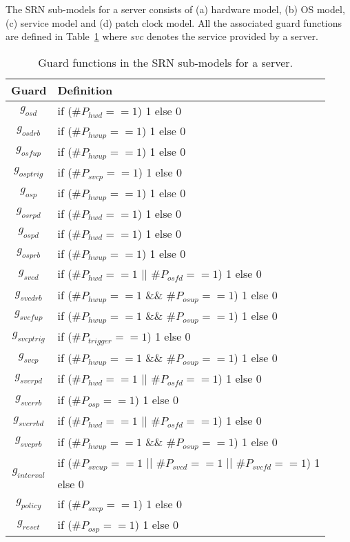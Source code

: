 \documentclass[conference]{IEEEtran}
\begin{document}
The SRN sub-models for a server consists of (a) hardware model, (b) OS model, (c) service model and (d) patch clock model. All the associated guard functions are defined in Table~\ref{tb_guard} where $\mathit{svc}$ denotes the service provided by a server.
\begin{table}[htb] \small
\caption{Guard functions in the SRN sub-models for a server.}
\label{tb_guard}
\centering
\begin{tabular}{|c|l|}
\hline
Guard & Definition\\
\hline
$g_{\mathit{osd}}$ & if (\#$P_{\mathit{hwd}}==1$) 1 else 0\\
\hline
$g_{\mathit{osdrb}}$ & if (\#$P_{\mathit{hwup}}==1$) 1 else 0\\
\hline
$g_{\mathit{osfup}}$ & if (\#$P_{\mathit{hwup}}==1$) 1 else 0\\
\hline
$g_{\mathit{osptrig}}$ & if (\#$P_{\mathit{svcp}}==1$) 1 else 0\\
\hline
$g_{\mathit{osp}}$ & if (\#$P_{\mathit{hwup}}==1$) 1 else 0\\
\hline
$g_{\mathit{osrpd}}$ & if (\#$P_{\mathit{hwd}}==1$) 1 else 0\\
\hline
$g_{\mathit{ospd}}$ & if (\#$P_{\mathit{hwd}}==1$) 1 else 0\\
\hline
$g_{\mathit{osprb}}$ & if (\#$P_{\mathit{hwup}}==1$) 1 else 0\\
\hline
$g_{\mathit{svcd}}$ & if (\#$P_{\mathit{hwd}}==1$ $||$ \#$P_{\mathit{osfd}}==1$) 1 else 0\\
\hline
$g_{\mathit{svcdrb}}$ & if (\#$P_{\mathit{hwup}}==1$ \&\& \#$P_{\mathit{osup}}==1$) 1 else 0\\
\hline
$g_{\mathit{svcfup}}$ & if (\#$P_{\mathit{hwup}}==1$ \&\& \#$P_{\mathit{osup}}==1$) 1 else 0\\
\hline
$g_{\mathit{svcptrig}}$ & if (\#$P_{\mathit{trigger}}==1$) 1 else 0\\
\hline
$g_{\mathit{svcp}}$ & if (\#$P_{\mathit{hwup}}==1$ \&\& \#$P_{\mathit{osup}}==1$) 1 else 0\\
\hline
$g_{\mathit{svcrpd}}$ & if (\#$P_{\mathit{hwd}}==1$ $||$ \#$P_{\mathit{osfd}}==1$) 1 else 0\\
\hline
$g_{\mathit{svcrrb}}$ & if (\#$P_{\mathit{osp}}==1$) 1 else 0\\
\hline
$g_{\mathit{svcrrbd}}$ & if (\#$P_{\mathit{hwd}}==1$ $||$ \#$P_{\mathit{osfd}}==1$) 1 else 0\\
\hline
$g_{\mathit{svcprb}}$ & if (\#$P_{\mathit{hwup}}==1$ \&\& \#$P_{\mathit{osup}}==1$) 1 else 0\\
\hline
\multirow{2}{*}{$g_{\mathit{interval}}$} & if (\#$P_{\mathit{svcup}}==1$ $||$ \#$P_{\mathit{svcd}}==1$ $||$ \#$P_{\mathit{svcfd}}==1$) 1\\
& else 0\\
\hline
$g_{\mathit{policy}}$ & if (\#$P_{\mathit{svcp}}==1$) 1 else 0\\
\hline
$g_{\mathit{reset}}$ & if (\#$P_{\mathit{osp}}==1$) 1 else 0\\
\hline
\end{tabular}
\end{table}
\end{document}
